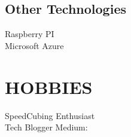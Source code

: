 \documentclass[]{deedy-resume-openfont}
\begin{document}
\begin{minipage}[t]{0.30\textwidth}
\subsection{Other Technologies}
 \textbullet{} Raspberry PI \\
 \textbullet{} Microsoft Azure \\
\bigskip


\section{HOBBIES}
\textbullet{} SpeedCubing Enthusiast  \\
\textbullet{} Tech Blogger Medium:  \href{https://medium.com/@anshul.ahu/}{} \\
\sectionsep




%
%

\end{minipage} 
\hfill
\end{document}
